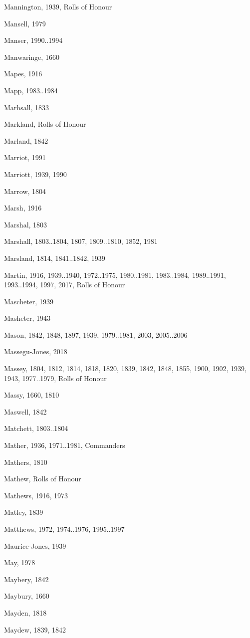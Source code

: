 {\begin{theindex}
\item Mannington, 1939, Rolls of Honour
\item Mansell, 1979
\item Manser, 1990..1994
\item Manwaringe, 1660
\item Mapes, 1916
\item Mapp, 1983..1984
\item Marhsall, 1833
\item Markland, Rolls of Honour
\item Marland, 1842
\item Marriot, 1991
\item Marriott, 1939, 1990
\item Marrow, 1804
\item Marsh, 1916
\item Marshal, 1803
\item Marshall, 1803..1804, 1807, 1809..1810, 1852, 1981
\item Marsland, 1814, 1841..1842, 1939
\item Martin, 1916, 1939..1940, 1972..1975, 1980..1981, 1983..1984, 1989..1991, 1993..1994, 1997, 2017, Rolls of Honour
\item Mascheter, 1939
\item Masheter, 1943
\item Mason, 1842, 1848, 1897, 1939, 1979..1981, 2003, 2005..2006
\item Massegu-Jones, 2018
\item Massey, 1804, 1812, 1814, 1818, 1820, 1839, 1842, 1848, 1855, 1900, 1902, 1939, 1943, 1977..1979, Rolls of Honour
\item Massy, 1660, 1810
\item Maswell, 1842
\item Matchett, 1803..1804
\item Mather, 1936, 1971..1981, Commanders
\item Mathers, 1810
\item Mathew, Rolls of Honour
\item Mathews, 1916, 1973
\item Matley, 1839
\item Matthews, 1972, 1974..1976, 1995..1997
\item Maurice-Jones, 1939
\item May, 1978
\item Maybery, 1842
\item Maybury, 1660
\item Mayden, 1818
\item Maydew, 1839, 1842

\end{theindex}}
